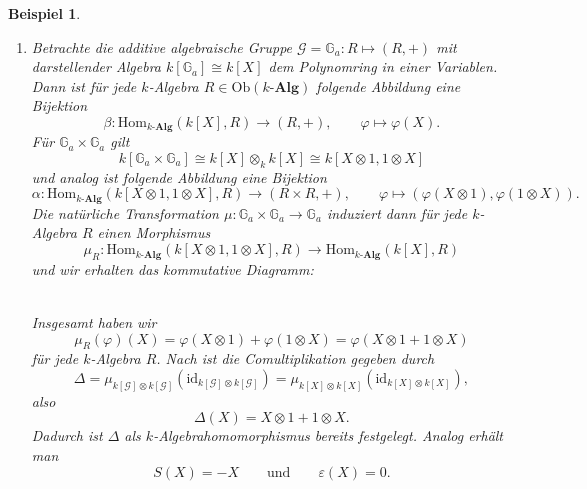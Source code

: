 \documentclass[a4paper, 11pt]{scrartcl}
\newcommand{\Hom}{\text{Hom}}
\newcommand{\id}{\text{id}}
\newcommand{\Ob}{\text{Ob}}
\theoremstyle{basicstyle}
\newtheorem{beispiel}[definition]{Beispiel}
\begin{document}
    \begin{beispiel}
        \begin{enumerate}
            \item Betrachte die additive algebraische Gruppe \(\mathcal{G} = \mathbb{G}_a : R \mapsto (R, +)\) mit darstellender Algebra \(k[\mathbb{G}_a] \cong k[X]\) dem Polynomring in einer Variablen.
                Dann ist für jede \(k\)-Algebra \(R \in \Ob(k\textbf{-Alg})\) folgende Abbildung eine Bijektion
                \[\beta: \Hom_{k\textbf{-Alg}}(k[X], R) \longrightarrow (R, +), \qquad \varphi \mapsto \varphi(X).\]
                Für \(\mathbb{G}_a \times \mathbb{G}_a\) gilt
                \[k[\mathbb{G}_a \times \mathbb{G}_a] \cong k[X] \otimes_k k[X] \cong k[X \otimes 1, 1 \otimes X]\]
                und analog ist folgende Abbildung eine Bijektion
                \[\alpha: \Hom_{k\textbf{-Alg}}(k[X \otimes 1, 1 \otimes X], R) \longrightarrow (R \times R, +), \qquad \varphi \mapsto (\varphi(X \otimes 1), \varphi(1 \otimes X)).\]
                Die natürliche Transformation \(\mu: \mathbb{G}_a \times \mathbb{G}_a \to \mathbb{G}_a\) induziert dann für jede \(k\)-Algebra \(R\) einen Morphismus
                \[\mu_R : \Hom_{k\textbf{-Alg}}(k[X \otimes 1, 1 \otimes X], R) \longrightarrow \Hom_{k\textbf{-Alg}}(k[X], R)\]
                und wir erhalten das kommutative Diagramm: 
                \begin{figure*}[ht!]
                    \centering
                \end{figure*} \\
                Insgesamt haben wir \[\mu_R(\varphi)(X) = \varphi(X \otimes 1) + \varphi(1 \otimes X) = \varphi(X \otimes 1 + 1 \otimes X)\]
                für jede \(k\)-Algebra \(R\).
                Nach  ist die Comultiplikation gegeben durch
                \[\Delta = \mu_{k[\mathcal{G}] \otimes k[\mathcal{G}]}(\id_{k[\mathcal{G}] \otimes k[\mathcal{G}]}) = \mu_{k[X] \otimes k[X]}(\id_{k[X] \otimes k[X]}),\]
                also \[\Delta(X) = X \otimes 1 + 1 \otimes X.\]
                Dadurch ist \(\Delta\) als \(k\)-Algebrahomomorphismus bereits festgelegt.
                Analog erhält man \[S(X) = -X \qquad\text{und}\qquad \varepsilon(X) = 0.\]


\end{enumerate}
\end{beispiel}
\end{document}
